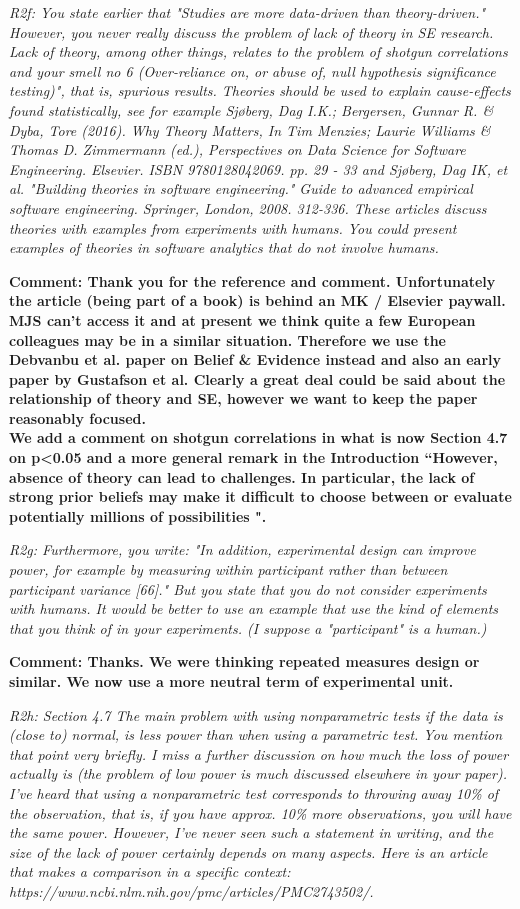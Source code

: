 \documentclass[preprint,10pt]{elsarticle}
\begin{document}
{\em
R2f:
You state earlier that "Studies are more data-driven than theory-driven." However, you never really discuss the problem of lack of theory in SE research. Lack of theory, among other things, relates to the problem of shotgun correlations and your smell no 6 (Over-reliance on, or abuse of, null hypothesis significance testing)", that is, spurious results. Theories should be used to explain cause-effects found statistically, see for example Sjøberg, Dag I.K.; Bergersen, Gunnar R. & Dyba, Tore (2016). Why Theory Matters, In Tim Menzies; Laurie Williams & Thomas D. Zimmermann (ed.), Perspectives on Data Science for Software Engineering.  Elsevier.  ISBN 9780128042069.  pp. 29 - 33 and Sjøberg, Dag IK, et al. "Building theories in software engineering." Guide to advanced empirical software engineering. Springer, London, 2008. 312-336. These articles discuss theories with examples from experiments with humans. You could present examples of theories in software analytics that do not involve humans.
}

{\bf Comment: Thank you for the reference and comment. Unfortunately the article (being part of a book) is behind an MK / Elsevier paywall.  MJS can't access it and at present we think quite a few European colleagues may be in a similar situation.  Therefore we use the Debvanbu et al. paper on Belief \& Evidence instead and also an early paper by Gustafson et al.  Clearly a great deal could be said about the relationship of theory and SE, however we want to keep the paper reasonably focused.\\
We add a comment on shotgun correlations in what is now Section 4.7 on p<0.05 and a more general remark in the Introduction ``However, absence of theory can lead to challenges.  In particular, the lack of strong prior beliefs may make it difficult to choose between or evaluate potentially millions of possibilities \cite{Gust93,Deva16}".}

{\em
R2g:
Furthermore, you write: "In addition, experimental design can improve power, for example by measuring within participant rather than between participant variance [66]." But you state that you do not consider experiments with humans. It would be better to use an example that use the kind of elements that you think of in your experiments. (I suppose a "participant" is a human.)
}

{\bf Comment: Thanks.  We were thinking repeated measures design or similar.  We now use a more neutral term of experimental unit.}

{\em
R2h:
Section 4.7
The main problem with using nonparametric tests if the data is (close to) normal, is less power than when using a parametric test. You mention that point very briefly. I miss a further discussion on how much the loss of power actually is (the problem of low power is much discussed elsewhere in your paper). I've heard that using a nonparametric test corresponds to throwing away 10\% of the observation, that is, if you have approx. 10\% more observations, you will have the same power. However, I've never seen such a statement in writing, and the size of the lack of power certainly depends on many aspects. Here is an article that makes a comparison in a specific context: https://www.ncbi.nlm.nih.gov/pmc/articles/PMC2743502/.
}
\end{document}
